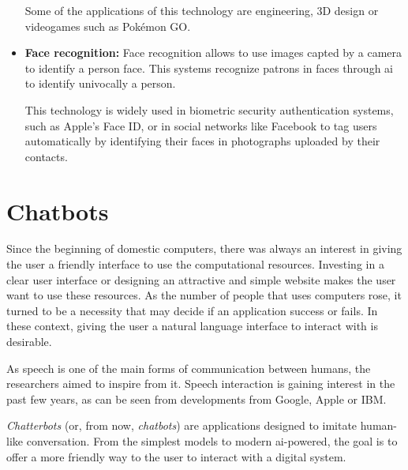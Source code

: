 \begin{itemize}
    
    Some of the applications of this technology are engineering, 3D design or videogames such as Pokémon GO.
    \item \textbf{Face recognition:} Face recognition allows to use images capted by a camera to identify a person face. This systems recognize patrons in faces through \acs{ai} to identify univocally a person. 
    
    This technology is widely used in biometric security authentication systems, such as Apple's Face ID, or in social networks like Facebook to tag users automatically by identifying their faces in photographs uploaded by their contacts.
\end{itemize}

\section{Chatbots}
Since the beginning of domestic computers, there was always an interest in giving the user a friendly interface to use the computational resources. Investing in a clear user interface or designing an attractive and simple website makes the user want to use these resources. As the number of people that uses computers rose, it turned to be a necessity that may decide if an application success or fails. In these context, giving the user a natural language interface to interact with is desirable.

As speech is one of the main forms of communication between humans, the researchers aimed to inspire from it. Speech interaction is gaining interest in the past few years, as can be seen from developments from Google, Apple or IBM. 

\textsl{Chatterbots} (or, from now, \textsl{chatbots}) are applications designed to imitate human-like conversation. From the simplest models to modern \acs{ai}-powered, the goal is to offer a more friendly way to the user to interact with a digital system. 

